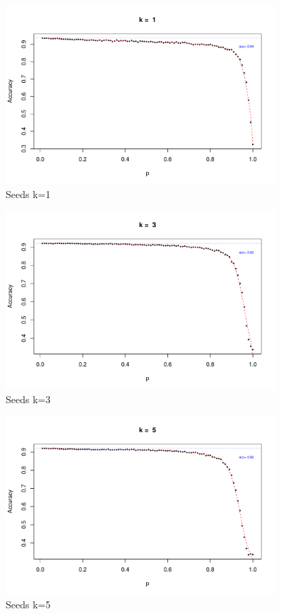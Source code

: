 \documentclass{article}
\begin{document}
\begin{figure}[h!]
 \centering
 \includegraphics[width=0.9\textwidth]{./figures/Seeds_k1.pdf}
 \caption{Seeds k=1}
 \label{fig:Seeds1}
\end{figure}
\begin{figure}[h!]
 \centering
 \includegraphics[width=0.9\textwidth]{./figures/Seeds_k3.pdf}
 \caption{Seeds k=3}
 \label{fig:Seeds3}
\end{figure}
\begin{figure}
 \centering
 \includegraphics[width=0.9\textwidth]{./figures/Seeds_k5.pdf}
 \caption{Seeds k=5}
 \label{fig:Seeds5}
\end{figure}
\end{document}
